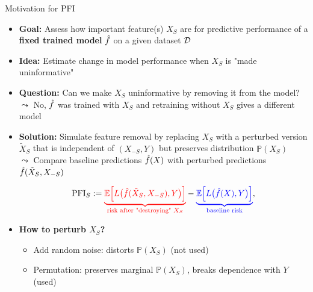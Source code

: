 \documentclass[10pt,compress,t,notes=noshow, xcolor=table]{beamer}
\begin{document}



\begin{frame}{Motivation for PFI}


\begin{itemize}
  \item<1-> \textbf{Goal:} Assess how important feature(s) $X_S$ are for predictive performance of a \textbf{fixed trained model} $\hat{f}$ on a given dataset $\mathcal{D}$
  \item<1-> \textbf{Idea:} Estimate change in model performance when $X_S$ is "made uninformative"
  \item<2-> \textbf{Question:} Can we make $X_S$ uninformative by removing it from the model?\\
  $\leadsto$ No, $\hat{f}$ was trained with $X_S$ and retraining without $X_S$ gives a  different model
  \item<3-> 
\textbf{Solution:} Simulate feature removal by replacing $X_S$ with a perturbed version $\tilde{X}_S$ that is independent of $(X_{-S}, Y)$ but preserves distribution $\mathbb{P}(X_S)$\\
  $\leadsto$ Compare {\color{blue}baseline predictions $\hat{f}(X)$} with {\color{red}perturbed predictions $\hat{f}(\tilde{X}_S, X_{-S})$}
  
  

\[
\text{PFI}_S :=
 {\color{red}\underbrace{\mathbb{E}\Big[L\big(\hat{f}(\tilde{X}_S, X_{-S}), Y\big)\Big]}_{\text{risk after "destroying" }X_S}}
 -
 {\color{blue}\underbrace{\mathbb{E}\Big[L\big(\hat{f}(X), Y\big)\Big]}_{\text{baseline risk}}},
\]
  \item<3-> \textbf{How to perturb $X_S$?}
  \begin{itemize}
    \item Add random noise: distorts $\mathbb{P}(X_S)$ (not used)
    \item Permutation: preserves marginal $\mathbb{P}(X_S)$, breaks dependence with $Y$ (used)
  \end{itemize}


\end{itemize}
\end{frame}
\end{document}
